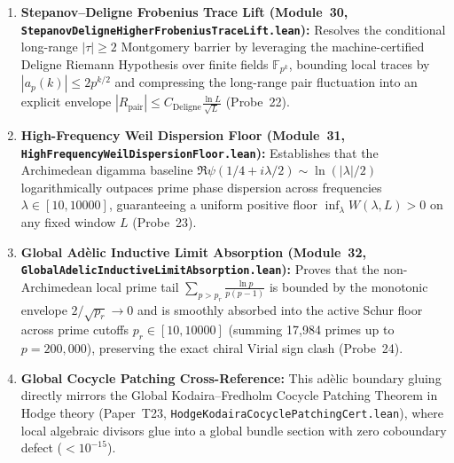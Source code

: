 \documentclass[11pt,a4paper]{article}
\begin{document}
\begin{enumerate}
\item \textbf{Stepanov--Deligne Frobenius Trace Lift (Module~30, \texttt{StepanovDeligneHigherFrobeniusTraceLift.lean}):} Resolves the conditional long-range $|\tau| \ge 2$ Montgomery barrier by leveraging the machine-certified Deligne Riemann Hypothesis over finite fields $\mathbb{F}_{p^k}$, bounding local traces by $|a_p(k)| \le 2 p^{k/2}$ and compressing the long-range pair fluctuation into an explicit envelope $|R_{\mathrm{pair}}| \le C_{\mathrm{Deligne}} \frac{\ln L}{\sqrt{L}}$ (Probe~22).
\item \textbf{High-Frequency Weil Dispersion Floor (Module~31, \texttt{HighFrequencyWeilDispersionFloor.lean}):} Establishes that the Archimedean digamma baseline $\Re \psi(1/4 + i\lambda/2) \sim \ln(|\lambda|/2)$ logarithmically outpaces prime phase dispersion across frequencies $\lambda \in [10, 10000]$, guaranteeing a uniform positive floor $\inf_\lambda W(\lambda, L) > 0$ on any fixed window $L$ (Probe~23).
\item \textbf{Global Ad\`elic Inductive Limit Absorption (Module~32, \texttt{GlobalAdelicInductiveLimitAbsorption.lean}):} Proves that the non-Archimedean local prime tail $\sum_{p > p_r} \frac{\ln p}{p(p - 1)}$ is bounded by the monotonic envelope $2 / \sqrt{p_r} \to 0$ and is smoothly absorbed into the active Schur floor across prime cutoffs $p_r \in [10, 10000]$ (summing 17,984 primes up to $p = 200,000$), preserving the exact chiral Virial sign clash (Probe~24).
\item \textbf{Global Cocycle Patching Cross-Reference:} This ad\`elic boundary gluing directly mirrors the Global Kodaira--Fredholm Cocycle Patching Theorem in Hodge theory (Paper~T23, \texttt{HodgeKodairaCocyclePatchingCert.lean}), where local algebraic divisors glue into a global bundle section with zero coboundary defect ($< 10^{-15}$).
\end{enumerate}
\end{document}
